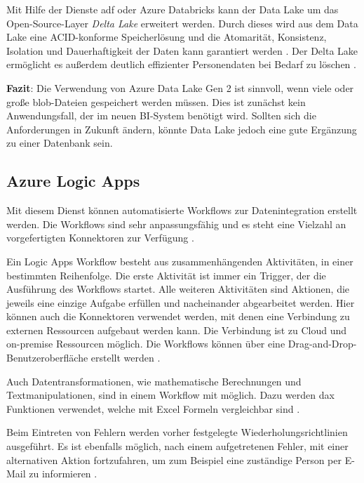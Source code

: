 Mit Hilfe der Dienste \ac{adf} oder Azure Databricks kann der Data Lake um das Open-Source-Layer \textit{Delta Lake} erweitert werden. Durch dieses wird aus dem Data Lake eine ACID-konforme Speicherlösung und die Atomarität, Konsistenz, Isolation und Dauerhaftigkeit der Daten kann garantiert werden \cite{lesteve_definitive_2021}. Der Delta Lake ermöglicht es außerdem deutlich effizienter Personendaten bei Bedarf zu löschen \cite{brown_best_2021}.

\textbf{Fazit}: Die Verwendung von Azure Data Lake Gen 2 ist sinnvoll, wenn viele oder große \ac{blob}-Dateien gespeichert werden müssen. Dies ist zunächst kein Anwendungsfall, der im neuen BI-System benötigt wird. Sollten sich die Anforderungen in Zukunft ändern, könnte Data Lake jedoch eine gute Ergänzung zu einer Datenbank sein.

\subsection{Azure Logic Apps} \label{sec:grundlagen:azure_dienste:logicApps}
Mit diesem Dienst können automatisierte Workflows zur Datenintegration erstellt werden. Die Workflows sind sehr anpassungsfähig und es steht eine Vielzahl an vorgefertigten Konnektoren zur Verfügung \cite{kumar_serverless_2019}.

Ein Logic Apps Workflow besteht aus zusammenhängenden Aktivitäten, in einer bestimmten Reihenfolge. Die erste Aktivität ist immer ein Trigger, der die Ausführung des Workflows startet. Alle weiteren Aktivitäten sind Aktionen, die jeweils eine einzige Aufgabe erfüllen und nacheinander abgearbeitet werden. Hier können auch die Konnektoren verwendet werden, mit denen eine Verbindung zu externen Ressourcen aufgebaut werden kann. Die Verbindung ist zu Cloud und on-premise Ressourcen möglich. Die Workflows können über eine Drag-and-Drop-Benutzeroberfläche erstellt werden \cite{modi_azure_2020}.

Auch Datentransformationen, wie mathematische Berechnungen und Textmanipulationen, sind in einem Workflow mit möglich. Dazu werden \ac{dax} Funktionen verwendet, welche mit Excel Formeln vergleichbar sind \cite{bennett_enterprise_2021}.

Beim Eintreten von Fehlern werden vorher festgelegte Wiederholungsrichtlinien ausgeführt. Es ist ebenfalls möglich, nach einem aufgetretenen Fehler, mit einer alternativen Aktion fortzufahren, um zum Beispiel eine zuständige Person per E-Mail zu informieren \cite{fan_handle_2021}.

